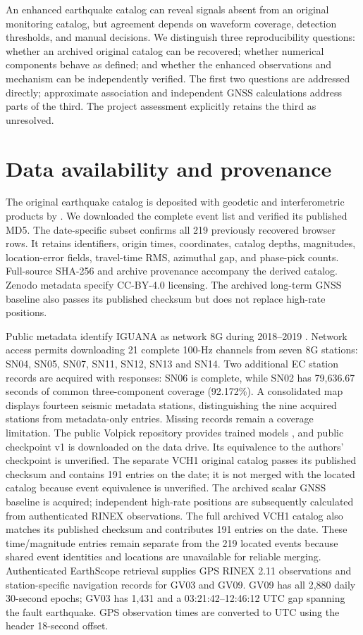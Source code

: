 \documentclass[11pt]{article}
\begin{document}
An enhanced earthquake catalog can reveal signals absent from an original monitoring catalog, but agreement depends on waveform coverage, detection thresholds, and manual decisions. We distinguish three reproducibility questions: whether an archived original catalog can be recovered; whether numerical components behave as defined; and whether the enhanced observations and mechanism can be independently verified. The first two questions are addressed directly; approximate association and independent GNSS calculations address parts of the third. The project assessment explicitly retains the third as unresolved.

\section{Data availability and provenance}
The original earthquake catalog is deposited with geodetic and interferometric products by \citet{bellarchive}. We downloaded the complete event list and verified its published MD5. The date-specific subset confirms all 219 previously recovered browser rows. It retains identifiers, origin times, coordinates, catalog depths, magnitudes, location-error fields, travel-time RMS, azimuthal gap, and phase-pick counts. Full-source SHA-256 and archive provenance accompany the derived catalog. Zenodo metadata specify CC-BY-4.0 licensing. The archived long-term GNSS baseline also passes its published checksum but does not replace high-rate positions.

Public metadata identify IGUANA as network 8G during 2018--2019 \citep{iguana}. Network access permits downloading 21 complete 100-Hz channels from seven 8G stations: SN04, SN05, SN07, SN11, SN12, SN13 and SN14. Two additional EC station records are acquired with responses: SN06 is complete, while SN02 has 79,636.67 seconds of common three-component coverage (92.172\%). A consolidated map displays fourteen seismic metadata stations, distinguishing the nine acquired stations from metadata-only entries. Missing records remain a coverage limitation. The public Volpick repository provides trained models \citep{volpick,zhong2024}, and public checkpoint v1 is downloaded on the data drive. Its equivalence to the authors' checkpoint is unverified. The separate VCH1 original catalog passes its published checksum and contains 191 entries on the date; it is not merged with the located catalog because event equivalence is unverified. The archived scalar GNSS baseline is acquired; independent high-rate positions are subsequently calculated from authenticated RINEX observations. The full archived VCH1 catalog also matches its published checksum and contributes 191 entries on the date. These time/magnitude entries remain separate from the 219 located events because shared event identities and locations are unavailable for reliable merging. Authenticated EarthScope retrieval supplies GPS RINEX 2.11 observations and station-specific navigation records for GV03 and GV09. GV09 has all 2,880 daily 30-second epochs; GV03 has 1,431 and a 03:21:42--12:46:12 UTC gap spanning the fault earthquake. GPS observation times are converted to UTC using the header 18-second offset.
\end{document}
